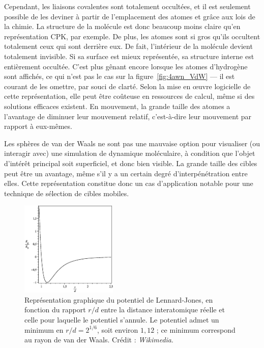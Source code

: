 	Cependant, les liaisons covalentes sont totalement occultées, et il est seulement possible de les \og deviner \fg{} à partir de l'emplacement des atomes et grâce aux lois de la chimie. La structure de la molécule est donc beaucoup moins claire qu'en représentation CPK, par exemple. De plus, les atomes sont si gros qu'ils occultent totalement ceux qui sont derrière eux. De fait, l'intérieur de la molécule devient totalement invisible. Si sa surface est mieux représentée, sa structure interne est entièrement occultée. C'est plus gênant encore lorsque les atomes d'hydrogène sont affichés, ce qui n'est pas le cas sur la figure~\ref{fig:4awn_VdW} --- il est courant de les omettre, par souci de clarté. Selon la mise en \oe{}uvre logicielle de cette représentation, elle peut être coûteuse en ressources de calcul, même si des solutions efficaces existent. En mouvement, la grande taille des atomes a l'avantage de diminuer leur mouvement relatif, c'est-à-dire leur mouvement par rapport à eux-mêmes.
		
	Les sphères de van der Waals ne sont pas une mauvaise option pour visualiser (ou interagir avec) une simulation de dynamique moléculaire, à condition que l'objet d'intérêt principal soit superficiel, et donc bien visible. La grande taille des cibles peut être un avantage, même s'il y a un certain degré d'interpénétration entre elles. Cette représentation constitue donc un cas d'application notable pour une technique de sélection de cibles mobiles.
	
 	\begin{figure}
 		\centering
 		\includegraphics[width=0.41\textwidth]{figures/ch1/lennard-jones}
		\caption[Représentation graphique du potentiel de Lennard-Jones.]{Représentation graphique du potentiel de Lennard-Jones, en fonction du rapport $r/d$ entre la distance interatomique réelle et celle pour laquelle le potentiel s'annule. Le potentiel admet un minimum en $r/d = 2^{1/6}$, soit environ $1,12$ ; ce minimum correspond au rayon de van der Waals. Crédit : \emph{Wikimedia}.}
 		\label{fig:lennard}
 	\end{figure}
	
